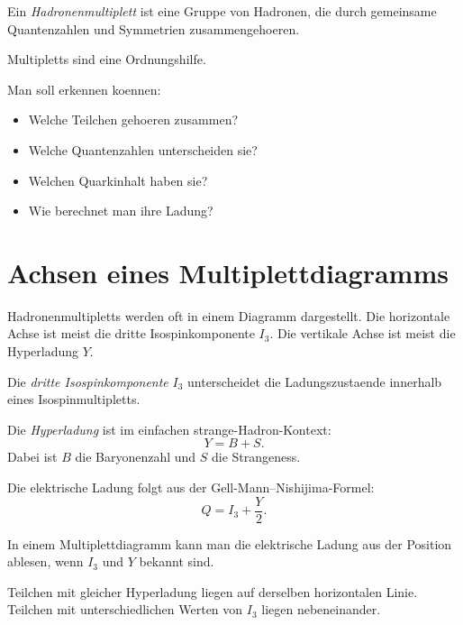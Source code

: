 \begin{definitionbox}
Ein \emph{Hadronenmultiplett} ist eine Gruppe von Hadronen, die durch gemeinsame
Quantenzahlen und Symmetrien zusammengehoeren.
\end{definitionbox}

\begin{examtipbox}
Multipletts sind eine Ordnungshilfe.

Man soll erkennen koennen:
\begin{itemize}
    \item Welche Teilchen gehoeren zusammen?
    \item Welche Quantenzahlen unterscheiden sie?
    \item Welchen Quarkinhalt haben sie?
    \item Wie berechnet man ihre Ladung?
\end{itemize}
\end{examtipbox}

\section{Achsen eines Multiplettdiagramms}

Hadronenmultipletts werden oft in einem Diagramm dargestellt.
Die horizontale Achse ist meist die dritte Isospinkomponente $I_3$.
Die vertikale Achse ist meist die Hyperladung $Y$.

\begin{definitionbox}
Die \emph{dritte Isospinkomponente} $I_3$ unterscheidet die Ladungszustaende innerhalb
eines Isospinmultipletts.
\end{definitionbox}

\begin{definitionbox}
Die \emph{Hyperladung} ist im einfachen strange-Hadron-Kontext:
\[
    Y = B + S.
\]
Dabei ist $B$ die Baryonenzahl und $S$ die Strangeness.
\end{definitionbox}

\begin{formulabox}
Die elektrische Ladung folgt aus der Gell-Mann--Nishijima-Formel:
\[
    Q = I_3 + \frac{Y}{2}.
\]
\end{formulabox}

\begin{conceptbox}
In einem Multiplettdiagramm kann man die elektrische Ladung aus der Position
ablesen, wenn $I_3$ und $Y$ bekannt sind.

Teilchen mit gleicher Hyperladung liegen auf derselben horizontalen Linie.
Teilchen mit unterschiedlichen Werten von $I_3$ liegen nebeneinander.
\end{conceptbox}

